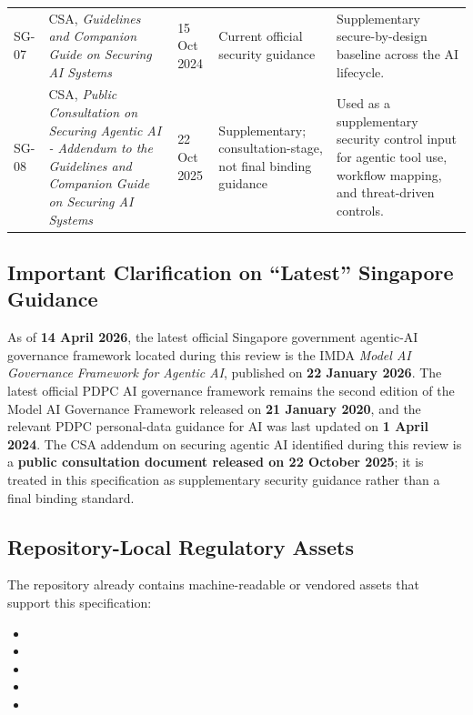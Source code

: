 \documentclass[11pt,a4paper]{article}
\begin{document}
\begin{longtable}{P{0.10\textwidth}P{0.28\textwidth}P{0.11\textwidth}P{0.16\textwidth}P{0.27\textwidth}}
SG-07 & CSA, \emph{Guidelines and Companion Guide on Securing AI Systems} & 15 Oct 2024 & Current official security guidance & Supplementary secure-by-design baseline across the AI lifecycle. \\
SG-08 & CSA, \emph{Public Consultation on Securing Agentic AI - Addendum to the Guidelines and Companion Guide on Securing AI Systems} & 22 Oct 2025 & Supplementary; consultation-stage, not final binding guidance & Used as a supplementary security control input for agentic tool use, workflow mapping, and threat-driven controls. \\
\bottomrule
\end{longtable}

\subsection{Important Clarification on ``Latest'' Singapore Guidance}

As of \textbf{14 April 2026}, the latest official Singapore government agentic-AI governance framework located during this review is the IMDA \emph{Model AI Governance Framework for Agentic AI}, published on \textbf{22 January 2026}. The latest official PDPC AI governance framework remains the second edition of the Model AI Governance Framework released on \textbf{21 January 2020}, and the relevant PDPC personal-data guidance for AI was last updated on \textbf{1 April 2024}. The CSA addendum on securing agentic AI identified during this review is a \textbf{public consultation document released on 22 October 2025}; it is treated in this specification as supplementary security guidance rather than a final binding standard.

\subsection{Repository-Local Regulatory Assets}

The repository already contains machine-readable or vendored assets that support this specification:

\begin{itemize}[nosep]
    \item {}
    \item {}
    \item {}
    \item {}
    \item {}
\end{itemize}
\end{document}
